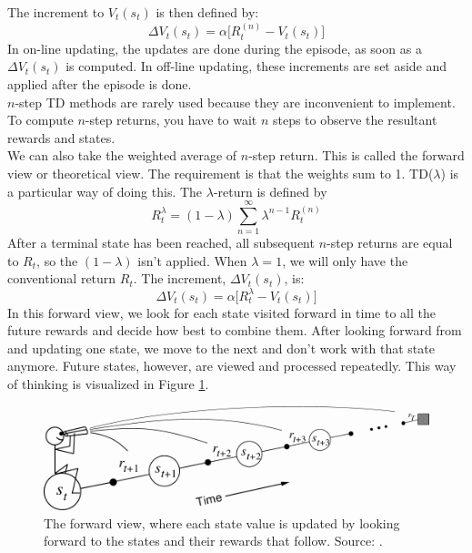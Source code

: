 \documentclass[a4paper, 11pt]{article}
\begin{document}
The increment to $V_t(s_t)$ is then defined by:
\begin{equation}
\Delta V_t(s_t) = \alpha \big[ R_t^{(n)} - V_t(s_t) \big]
\end{equation}
In on-line updating, the updates are done during the episode, as soon as a $\Delta V_t(s_t)$ is computed. In off-line updating, these increments are set aside and applied after the episode is done.\\
$n$-step TD methods are rarely used because they are inconvenient to implement. To compute $n$-step returns, you have to wait $n$ steps to observe the resultant rewards and states.\\

We can also take the weighted average of $n$-step return. This is called the forward view or theoretical view. The requirement is that the weights sum to 1. TD($\lambda$) is a particular way of doing this. The $\lambda$-return is defined by
\begin{equation}
R^\lambda_t = (1-\lambda) \sum_{n=1}^{\infty} \lambda^{n-1} R_t^{(n)}
\end{equation}
After a terminal state has been reached, all subsequent $n$-step returns are equal to $R_t$, so the $(1-\lambda)$ isn't applied. When $\lambda=1$, we will only have the conventional return $R_t$. The increment, $\Delta V_t(s_t)$, is:
\begin{equation}
\Delta V_t(s_t) = \alpha \big[ R_t^{\lambda} - V_t(s_t) \big]
\end{equation}
In this forward view, we look for each state visited forward in time to all the future rewards and decide how best to combine them. After looking forward from and updating one state, we move to the next and don't work with that state anymore. Future states, however, are viewed and processed repeatedly. This way of thinking is visualized in Figure \ref{fig:TDForwardView}.
\begin{figure}[htb]
\includegraphics[width=\linewidth]{images/TDForwardView.png}
\caption[TD forward view]{The forward view, where each state value is updated by looking forward to the states and their rewards that follow. Source: \cite{Sutton1998ReinforcementIntroduction}.}
\label{fig:TDForwardView}
\end{figure}
\end{document}
